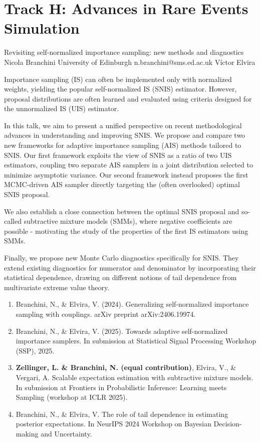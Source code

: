 \section{Track H: Advances in Rare Events Simulation}\newpage

\begin{talk}
  {Revisiting self-normalized importance sampling: new methods and diagnostics}%
  {Nicola Branchini}%
  {University of Edinburgh}%
  {n.branchini@sms.ed.ac.uk}%
  {V\'ictor Elvira}%
  
    
   
Importance sampling (IS) can often be implemented only with normalized weights, yielding the popular self-normalized IS (SNIS) estimator. However, proposal distributions are often learned and evaluated using criteria designed for the unnormalized IS (UIS) estimator.

In this talk, we aim to present a unified perspective on recent methodological advances in understanding and improving SNIS.
We propose and compare two new frameworks for adaptive importance sampling (AIS) methods tailored to SNIS. Our first framework exploits the view of SNIS as a ratio of two UIS estimators, coupling two separate AIS samplers in a joint distribution selected to minimize asymptotic variance. Our second framework instead proposes the first MCMC-driven AIS sampler directly targeting the (often overlooked) optimal SNIS proposal.

We also establish a close connection between the optimal SNIS proposal and so-called subtractive mixture models (SMMs), where negative coefficients are possible - motivating the study of the properties of the first IS estimators using SMMs.

Finally, we propose new Monte Carlo diagnostics specifically for SNIS. They extend existing diagnostics for numerator and denominator by incorporating their statistical dependence, drawing on different notions of tail dependence from multivariate extreme value theory.

\medskip

\begin{enumerate}
 \item[{[1]}] Branchini, N., \& Elvira, V. (2024). Generalizing self-normalized importance sampling with couplings. arXiv preprint arXiv:2406.19974.
 \item[{[2]}] Branchini, N., \& Elvira, V. (2025). Towards adaptive self-normalized importance samplers. In submission at Statistical Signal Processing Workshop (SSP), 2025.
    \item[{[3]}] \textbf{Zellinger, L. \& Branchini, N. (equal contribution)}, Elvira, V., \& Vergari, A. Scalable expectation estimation with subtractive mixture models. In submission at Frontiers in Probabilistic Inference: Learning meets Sampling (workshop at ICLR 2025).
    \item[{[4]}] Branchini, N., \& Elvira, V. The role of tail dependence in estimating posterior expectations. In NeurIPS 2024 Workshop on Bayesian Decision-making and Uncertainty.



\end{enumerate}
\end{talk}
